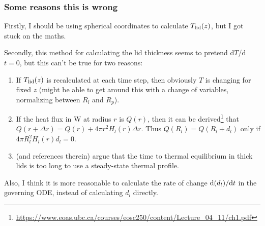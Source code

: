 \documentclass[10pt,a4paper]{article}
\begin{document}
\subsubsection{Some reasons this is wrong}

Firstly, I should be using spherical coordinates to calculate $T_{\rm lid}(z)$, but I got stuck on the maths.

Secondly, this method for calculating the lid thickness seems to pretend d$T$/d$t = 0$, but this can't be true for two reasons: 
\begin{enumerate}
\item If $T_{\rm lid}(z)$ is recalculated at each time step, then obviously $T$ is changing for fixed $z$ (might be able to get around this with a change of variables, normalizing between $R_l$ and $R_p$).
\item If the heat flux in W at radius $r$ is $Q(r)$, then it can be derived\footnote{\url{https://www.eoas.ubc.ca/courses/eosc250/content/Lecture_04_11/ch1.pdf}} that $Q(r + \Delta r) = Q(r) + 4\pi r^2 H_l(r) \Delta r$. Thus $Q(R_l) = Q(R_l + d_l)$ only if $4\pi R_l^2 H_l(r) d_l = 0$.
\item \citet{Thiriet2019} (and references therein) argue that the time to thermal equilibrium in thick lids is too long to use a steady-state thermal profile.
\end{enumerate}

Also, I think it is more reasonable to calculate the rate of change ${\rm d}(d_l)/{\rm d}t$ in the governing ODE, instead of calculating $d_l$ directly. 


\end{document}
